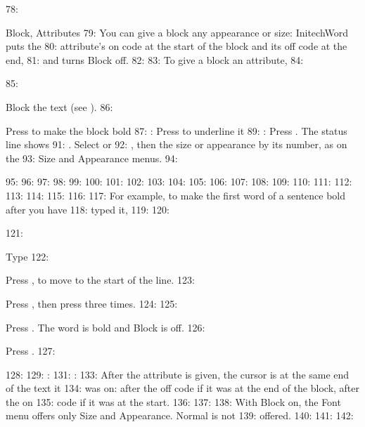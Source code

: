 78: \begin{Feature}{Block, Attributes}
79: You can give a block any appearance or size: InitechWord puts the
80: attribute's on code at the start of the block and its off code at the end,
81: and turns Block off.
82: 
83: To give a block an attribute,
84: \begin{WPSteps}
85: \item Block the text (see ).
86: \item Press  to make the block bold
87: : Press  to underline it
89: : Press .  The status line shows
91: .  Select  or
92: , then the size or appearance by its number, as on the
93: Size and Appearance menus.
94: \end{WPSteps}
95: 
96: 
97: 
98: 
99: 
100: 
101: 
102: 
103: 
104: 
105: 
106: 
107: 
108: 
109: 
110: 
111: 
112: 
113: 
114: 
115: 
116: 
117: For example, to make the first word of a sentence bold after you have
118: typed it,
119: 
120: \begin{WPSteps}
121: \item Type 
122: \item Press ,  to move to the start of the line.
123: \item Press , then press  three times.
124: 
125: \item Press .  The word is bold and Block is off.
126: \item Press .
127: \end{WPSteps}
128: 
129: : 
131: : 
133: After the attribute is given, the cursor is at the same end of the text it
134: was on: after the off code if it was at the end of the block, after the on
135: code if it was at the start.
136: 
137: 
138: With Block on, the Font menu offers only Size and Appearance.  Normal is not
139: offered.
140: 
141: 
142: \end{Feature}
